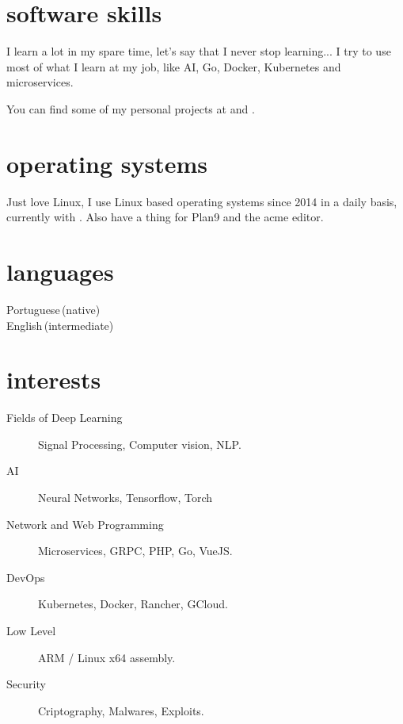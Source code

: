 \documentclass[]{cv-mauri}
\begin{document}
\section*{software skills}
    I learn a lot in my spare time, let's say that I never stop learning... I try to use most of what I learn at my job, like AI, Go, Docker, Kubernetes and microservices. 
    
    You can find some of my personal projects at \href{https://github.com/mauri870}{\color{maincolor}{https://github.com/mauri870}} and \href{https://mauri870.github.io}{\color{maincolor}{https://mauri870.github.io}}.

\section*{operating systems}
	Just love Linux, I use Linux based operating systems since 2014 in a daily basis, currently with \href{https://github.com/mauri870/dot-files}{}. Also have a thing for Plan9 and the acme editor.

\section*{languages}
\begin{tabularcv}
    Portuguese\,(native)\\[\vspacepar]
    English\,(intermediate)
\end{tabularcv}

\section*{interests}
	\begin{description}
		\item [Fields of Deep Learning] Signal Processing, Computer vision, NLP.
		\item [AI] Neural Networks, Tensorflow, Torch
		\item [Network and Web Programming] Microservices, GRPC, PHP, Go, VueJS.
		\item [DevOps] Kubernetes, Docker, Rancher, GCloud.
		\item [Low Level] ARM / Linux x64 assembly.
		\item [Security] Criptography, Malwares, Exploits.
	\end{description}
\end{document}
